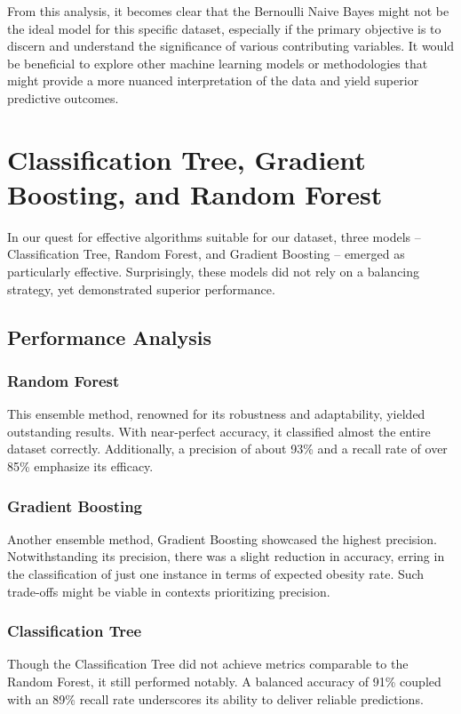         From this analysis, it becomes clear that the Bernoulli Naive Bayes might not be the ideal model for this specific dataset, especially if the primary objective is to discern and understand the significance of various contributing variables. It would be beneficial to explore other machine learning models or methodologies that might provide a more nuanced interpretation of the data and yield superior predictive outcomes.


    \section{Classification Tree, Gradient Boosting, and Random Forest}

        In our quest for effective algorithms suitable for our dataset, three models -- Classification Tree, Random Forest, and Gradient Boosting -- emerged as particularly effective. Surprisingly, these models did not rely on a balancing strategy, yet demonstrated superior performance.

        \subsection{Performance Analysis}

            \subsubsection{Random Forest}
                This ensemble method, renowned for its robustness and adaptability, yielded outstanding results. With near-perfect accuracy, it classified almost the entire dataset correctly. Additionally, a precision of about 93\% and a recall rate of over 85\% emphasize its efficacy.

            \subsubsection{Gradient Boosting}
                Another ensemble method, Gradient Boosting showcased the highest precision. Notwithstanding its precision, there was a slight reduction in accuracy, erring in the classification of just one instance in terms of expected obesity rate. Such trade-offs might be viable in contexts prioritizing precision.

            \subsubsection{Classification Tree}
                Though the Classification Tree did not achieve metrics comparable to the Random Forest, it still performed notably. A balanced accuracy of 91\% coupled with an 89\% recall rate underscores its ability to deliver reliable predictions.

